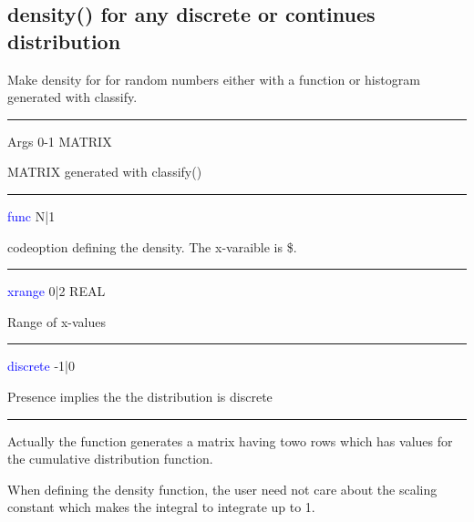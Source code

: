 \subsection{\textcolor{VioletRed}{density}() for any discrete or continues distribution}
\label{density}
Make density for for random numbers either with a function
or histogram generated with classify.
\vspace{0.3cm}
\hrule
\vspace{0.3cm}
\noindent Args \tabto{3cm} 0-1 \tabto{5cm}  MATRIX  \tabto{7cm}
\begin{changemargin}{3cm}{0cm}
\noindent  MATRIX generated with \textcolor{VioletRed}{classify}()
\end{changemargin}
\vspace{0.3cm}
\hrule
\vspace{0.3cm}
\noindent \textcolor{blue}{func} \tabto{3cm}  N|1 \tabto{5cm}    \tabto{7cm}
\begin{changemargin}{3cm}{0cm}
\noindent codeoption defining the density. The x-varaible is \$.
\end{changemargin}
\vspace{0.3cm}
\hrule
\vspace{0.3cm}
\noindent \textcolor{blue}{xrange} \tabto{3cm} 0|2 \tabto{5cm}   REAL \tabto{7cm}
\begin{changemargin}{3cm}{0cm}
\noindent  Range of x-values
\end{changemargin}
\vspace{0.3cm}
\hrule
\vspace{0.3cm}
\noindent \textcolor{blue}{discrete} \tabto{3cm} -1|0 \tabto{5cm}    \tabto{7cm}
\begin{changemargin}{3cm}{0cm}
\noindent  Presence implies the the distribution is discrete
\end {changemargin}
\hrule
\vspace{0.2cm}
\begin{note}
Actually the function generates a matrix having towo rows which
has values for the cumulative distribution function.
\end{note}
\begin{note}
When defining the density function, the user need not care about
the scaling constant which makes the integral to integrate up to 1.
\end{note}
